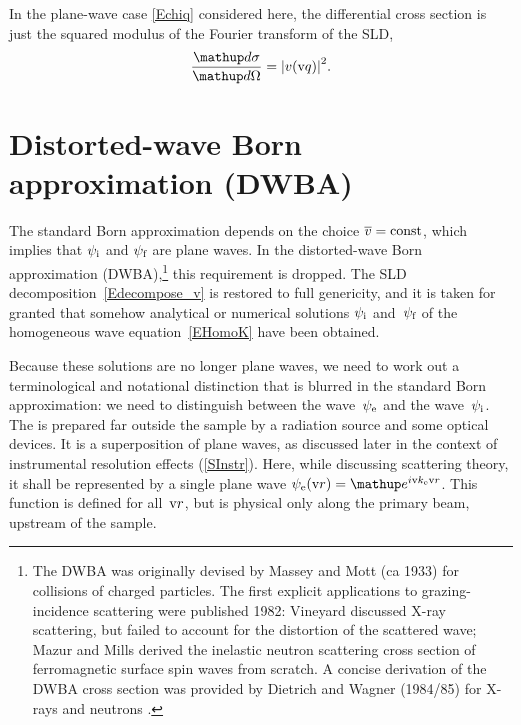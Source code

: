 In the plane-wave case \cref{Echiq} considered here,
the differential cross section is just the squared modulus
of the Fourier transform of the SLD,
%
\begin{equation}\label{Ecross1}
  \xElas
  = {\left| v(\q) \right|}^2.
\end{equation}

\section{Distorted-wave Born approximation (DWBA)}\label{SDWBA}

%
%

The standard Born approximation depends on the choice $\mv=\text{const}$,
which implies that $\psi_\si$ and $\psi_\sf$ are plane waves.
In the distorted-wave Born approximation (DWBA),\footnote{
The DWBA was originally devised by Massey and Mott (ca 1933)
for collisions of charged particles.
The first explicit applications to grazing-incidence scattering
were published 1982:
Vineyard \cite{Vin82} discussed X-ray scattering,
but failed to account for the distortion of the scattered wave;
Mazur and Mills \cite{MaMi82} derived the inelastic neutron scattering cross section
of ferromagnetic surface spin waves from scratch.
A concise derivation of the DWBA cross section
was provided by Dietrich and Wagner (1984/85) for X-rays \cite{DiWa84}
and neutrons \cite{DiWa85}.}
this requirement is dropped.
The SLD decomposition~\cref{Edecompose_v}
is restored to full genericity,
and it is taken for granted
that somehow analytical or numerical solutions $\psi_\si$ and~$\psi_\sf$
of the homogeneous wave equation~\cref{EHomoK}
have been obtained.

Because these solutions are no longer plane waves,
we need to work out a terminological and notational distinction
that is blurred in the standard Born approximation:
we need to distinguish
 between the  wave~$\psi_\se$
%
and the  wave~$\psi_\si$.
The 
%
%
is prepared far
outside the sample by a radiation source and some optical devices.
%
It is a superposition of plane waves,
as discussed later in the context of instrumental resolution effects
(\cref{SInstr}).
Here, while discussing scattering theory,
it shall be represented by a single plane wave
$\psi_\se(\r)=\e^{i\k_\se\r}$.
This function is defined for all~$\r$,
but is physical only along the primary beam, upstream of the sample.

